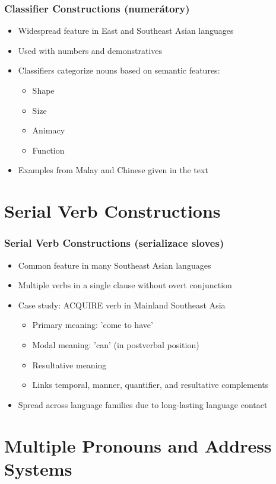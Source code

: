 \documentclass{beamer}
\begin{document}
\begin{frame}
\frametitle{Classifier Constructions (numerátory)}
\begin{itemize}
\item Widespread feature in East and Southeast Asian languages
\item Used with numbers and demonstratives
\item Classifiers categorize nouns based on semantic features:
  \begin{itemize}
  \item Shape
  \item Size
  \item Animacy
  \item Function
  \end{itemize}
\item Examples from Malay and Chinese given in the text
\end{itemize}
\end{frame}

\section{Serial Verb Constructions}

\begin{frame}
\frametitle{Serial Verb Constructions (serializace sloves)}
\begin{itemize}
\item Common feature in many Southeast Asian languages
\item Multiple verbs in a single clause without overt conjunction
\item Case study: ACQUIRE verb in Mainland Southeast Asia
  \begin{itemize}
  \item Primary meaning: 'come to have'
  \item Modal meaning: 'can' (in postverbal position)
  \item Resultative meaning
  \item Links temporal, manner, quantifier, and resultative complements
  \end{itemize}
\item Spread across language families due to long-lasting language contact
\end{itemize}
\end{frame}

\section{Multiple Pronouns and Address Systems}
\end{document}
